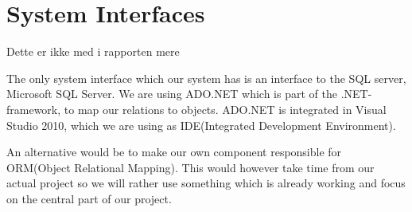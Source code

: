 \section{System Interfaces}
\label{sec:system_interfaces}


Dette er ikke med i rapporten mere

The only system interface which our system has is an interface to the SQL server, Microsoft SQL Server.
We are using ADO.NET which is part of the .NET-framework, to map our relations to objects.\cite{ado10}
ADO.NET is integrated in Visual Studio 2010, which we are using as IDE(Integrated Development Environment).

An alternative would be to make our own component responsible for ORM(Object Relational Mapping).
This would however take time from our actual project so we will rather use something which is already working and focus on the central part of our project.